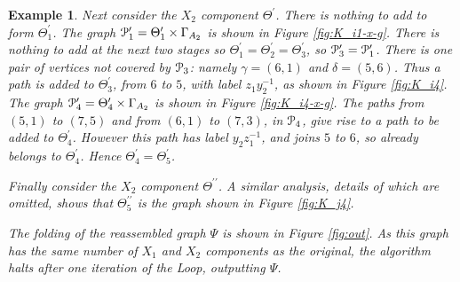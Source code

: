 \documentclass[a4paper,12pt]{article}
\newcommand{\G}{\Gamma }
\newcommand{\g}{\gamma }
\renewcommand{\d}{\delta }
\newcommand{\T}{\Theta }
\newcommand{\cP}{{\cal{P}}}
\newtheorem{exam}[theorem]{Example}
\newenvironment{example}{\begin{exam} \rm}{\end{exam}}
\numberwithin{equation}{section}
\numberwithin{figure}{section}
\begin{document}
\begin{example}
Next consider the $X_2$ component $\T^\prime$. There is nothing to
add to form $\T^\prime_1$. The graph $\cP_1^\prime=\T_1^\prime
\times \G_{A_2}$ is shown in Figure \ref{fig:K_i1-x-g}. There is
nothing to add at the next two  stages so
$\T_1^\prime=\T_2^\prime=\T_3^\prime$, so
$\cP_3^\prime=\cP_1^\prime$. There is one pair of vertices not
covered by $\cP_3$: namely $\g=(6,1)$ and $\d=(5,6)$. Thus a path
is added to $\T_3^\prime$, from $6$ to $5$, with label
$z_1y_2^{-1}$, as shown in Figure \ref{fig:K_i4}. The graph
 $\cP_4^\prime=\T_4^\prime \times \G_{A_2}$ is shown in Figure \ref{fig:K_i4-x-g}. The paths
from $(5,1)$ to $(7,5)$ and from $(6,1)$ to $(7,3)$, in $\cP_4$, give rise to a path to be
added to $\T_4^\prime$. However this path has label $y_2z_1^{-1}$, and joins $5$ to $6$, so already
belongs to $\T_4^\prime$. Hence $\T_4^\prime=\T_5^\prime$.

Finally consider the $X_2$ component $\T^{\prime\prime}$. A similar analysis, details of which
are omitted, shows that $ \T^{\prime\prime}_5$ is the graph shown in Figure \ref{fig:K_j4}.

The folding of the reassembled graph $\Psi$ is shown in  Figure
\ref{fig:out}.  As this graph has the same number of $X_1$ and $X_2$ components as the original,
the algorithm halts after one iteration of the Loop, outputting $\Psi$.





\end{example}
\end{document}
